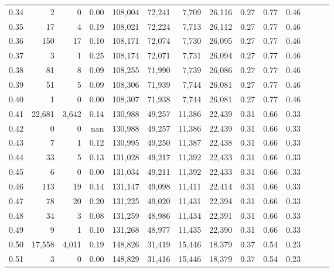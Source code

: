 \begin{tabular}{rrrrrrrrrrrrrr}
0.34 &       2 &      0 &  0.00 &  108,004 &   72,241 &   7,709 &  26,116 &  0.27 &  0.77 &      0.46 \\
0.35 &      17 &      4 &  0.19 &  108,021 &   72,224 &   7,713 &  26,112 &  0.27 &  0.77 &      0.46 \\
0.36 &     150 &     17 &  0.10 &  108,171 &   72,074 &   7,730 &  26,095 &  0.27 &  0.77 &      0.46 \\
0.37 &       3 &      1 &  0.25 &  108,174 &   72,071 &   7,731 &  26,094 &  0.27 &  0.77 &      0.46 \\
0.38 &      81 &      8 &  0.09 &  108,255 &   71,990 &   7,739 &  26,086 &  0.27 &  0.77 &      0.46 \\
0.39 &      51 &      5 &  0.09 &  108,306 &   71,939 &   7,744 &  26,081 &  0.27 &  0.77 &      0.46 \\
0.40 &       1 &      0 &  0.00 &  108,307 &   71,938 &   7,744 &  26,081 &  0.27 &  0.77 &      0.46 \\
0.41 &  22,681 &  3,642 &  0.14 &  130,988 &   49,257 &  11,386 &  22,439 &  0.31 &  0.66 &      0.33 \\
0.42 &       0 &      0 &   nan &  130,988 &   49,257 &  11,386 &  22,439 &  0.31 &  0.66 &      0.33 \\
0.43 &       7 &      1 &  0.12 &  130,995 &   49,250 &  11,387 &  22,438 &  0.31 &  0.66 &      0.33 \\
0.44 &      33 &      5 &  0.13 &  131,028 &   49,217 &  11,392 &  22,433 &  0.31 &  0.66 &      0.33 \\
0.45 &       6 &      0 &  0.00 &  131,034 &   49,211 &  11,392 &  22,433 &  0.31 &  0.66 &      0.33 \\
0.46 &     113 &     19 &  0.14 &  131,147 &   49,098 &  11,411 &  22,414 &  0.31 &  0.66 &      0.33 \\
0.47 &      78 &     20 &  0.20 &  131,225 &   49,020 &  11,431 &  22,394 &  0.31 &  0.66 &      0.33 \\
0.48 &      34 &      3 &  0.08 &  131,259 &   48,986 &  11,434 &  22,391 &  0.31 &  0.66 &      0.33 \\
0.49 &       9 &      1 &  0.10 &  131,268 &   48,977 &  11,435 &  22,390 &  0.31 &  0.66 &      0.33 \\
0.50 &  17,558 &  4,011 &  0.19 &  148,826 &   31,419 &  15,446 &  18,379 &  0.37 &  0.54 &      0.23 \\
0.51 &       3 &      0 &  0.00 &  148,829 &   31,416 &  15,446 &  18,379 &  0.37 &  0.54 &      0.23 \\

\end{tabular}

